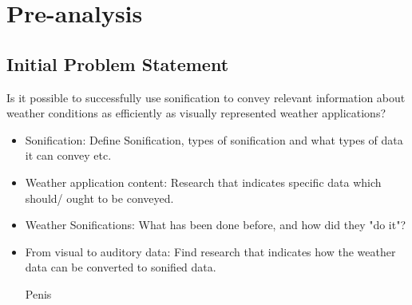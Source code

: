 \section{Pre-analysis} \label{sec:preanalysus}

\subsection{Initial Problem Statement} \label{sec:ips}
Is it possible to successfully use sonification to convey relevant information about weather conditions as efficiently as visually represented weather applications?

\begin{itemize}
\item Sonification: 
Define Sonification, types of sonification and what types of data it can convey etc.
\item Weather application content:
Research that indicates specific data which should/ ought to be conveyed.
\item Weather Sonifications:
What has been done before, and how did they "do it"?
\item From visual to auditory data:
Find research that indicates how the weather data can be converted to sonified data.



Penis
\end{itemize}
